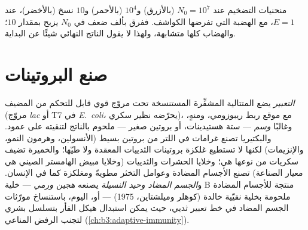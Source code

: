 \begin{omfigure}

{\small منحنيات التضخيم عند $N_{0} = 10^{7}$ (بالأزرق) و$10^{4}$ (بالأحمر)
و$10$ نسخ (بالأخضر)، عند $E = 1$، مع الهضبة التي تفرضها الكواشف. ففرق بألف ضعف في
$N_{0}$ يزيح  بمقدار $10$؛ والهضاب كلها متشابهة،
ولهذا لا يقول الناتج النهائي شيئًا عن البداية.}
\end{omfigure}

\section{صنع البروتينات}

\begin{definition}\label{def:b3:genetic-engineering:expression}
\emph{ التعبير} يضع المتتالية المشفِّرة المستنسخة تحت
مروّج قوي قابل للتحكم من المضيف (مروّج \emph{lac} أو T7
في \emph{E.~coli}، يحرّضه نظير سكري)، مع
موقع ربط ريبوزومي، ومنهٍ، وغالبًا \emph{وسم} --- ستة
هستيدينات، أو بروتين صغير --- ملحوم بالناتج لتنقيته
على عمود. والبكتيريا تصنع غرامات في اللتر من بروتين بسيط
(الأنسولين، وهرمون النمو، والإنزيمات) لكنها لا تستطيع غلكزة
بروتينات الثدييات المعقدة ولا طيّها؛ والخميرة تضيف سكريات من نوعها هي؛ وخلايا
الحشرات والثدييات (وخلايا مبيض الهامستر الصيني هي معيار الصناعة)
تصنع الأجسام المضادة وعوامل التخثر مطويةً ومغلكزة
كما في الإنسان. و\emph{الجسم المضاد وحيد النسيلة} يصنعه
\emph{هجين ورمي} --- خلية B منتجة للأجسام المضادة ملحومة بخلية
نقيّية خالدة (كوهلر وميلشتاين، 1975) --- أو، اليوم، باستنساخ
مورّثات الجسم المضاد في خط تعبير ثديي، حيث يمكن استبدال
هيكل الفأر بتسلسل بشري لتجنب الرفض المناعي
(\cref{ch:b3:adaptive-immunity}).
\end{definition}

